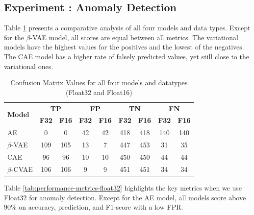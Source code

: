 \subsection{Experiment : Anomaly Detection}

Table \ref{tab:confusion-matrix-results} presents a comparative analysis of all four models and data types. Except for the $\beta$-VAE model, all scores are equal between all metrics. The variational models have the highest values for the positives and the lowest of the negatives. The CAE model has a higher rate of falsely predicted values, yet still close to the variational ones.

\begin{table}[!htbp]
\centering
\begin{tabular}{l cccccccc}
\toprule
\multirow{2}{*}{\textbf{Model}} & \multicolumn{2}{c}{\textbf{TP}} & \multicolumn{2}{c}{\textbf{FP}} & \multicolumn{2}{c}{\textbf{TN}} & \multicolumn{2}{c}{\textbf{FN}} \\
\cmidrule(lr){2-3} \cmidrule(lr){4-5} \cmidrule(lr){6-7} \cmidrule(lr){8-9}
& \textbf{F32} & \textbf{F16} & \textbf{F32} & \textbf{F16} & \textbf{F32} & \textbf{F16} & \textbf{F32} & \textbf{F16} \\
\midrule
\rowcolor{gray!10} AE   & 0 & 0 & 42 & 42 & 418 & 418 & 140 & 140 \\
$\beta$-VAE  & 109 & 105 & 13 & 7 & 447 & 453 & 31 & 35 \\
\rowcolor{gray!10} CAE  & 96 & 96 & 10 & 10 & 450 & 450 & 44 & 44 \\
$\beta$-CVAE & 106 & 106 & 9 & 9 & 451 & 451 & 34 & 34 \\
\bottomrule
\end{tabular}
\caption{Confusion Matrix Values for all four models and datatypes (Float32 and Float16)}
\label{tab:confusion-matrix-results}
\end{table}

Table \ref{tab:performance-metrics-float32} highlights the key metrics when we use Float32 for anomaly detection. Except for the AE model, all models score above 90\% on accuracy, prediction, and F1-score with a low FPR.

